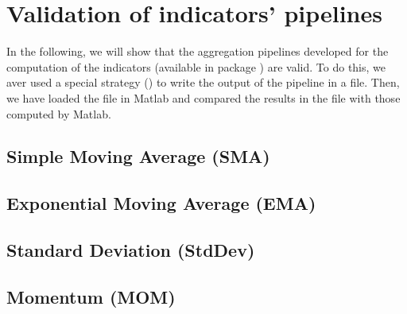 \section{Validation of indicators' pipelines}\label{sec:indicatorsvalidation}

In the following, we will show that the aggregation pipelines developed for the
computation of the indicators (available in package
) are valid. To do this, we aver used a
special strategy () to write the output of the
pipeline in a file. Then, we have loaded the file in Matlab and compared the
results in the file with those computed by Matlab.

\subsection{Simple Moving Average (SMA)}

\subsection{Exponential Moving Average (EMA)}

\subsection{Standard Deviation (StdDev)}

\subsection{Momentum (MOM)}
